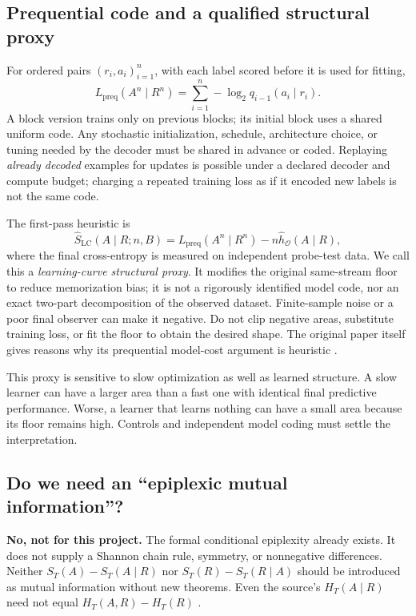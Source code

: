 \documentclass[11pt,a4paper]{article}
\newcommand{\pre}{\mathrm{preq}}
\begin{document}
\subsection{Prequential code and a qualified structural proxy}
For ordered pairs $(r_i,a_i)_{i=1}^n$, with each label scored before it is used for fitting,
\begin{equation}
L_{\pre}(A^n\mid R^n)=\sum_{i=1}^{n}-\log_2 q_{i-1}(a_i\mid r_i).
\label{eq:preq}
\end{equation}
A block version trains only on previous blocks; its initial block uses a shared uniform code. Any stochastic initialization, schedule, architecture choice, or tuning needed by the decoder must be shared in advance or coded. Replaying \emph{already decoded} examples for updates is possible under a declared decoder and compute budget; charging a repeated training loss as if it encoded new labels is not the same code.

The first-pass heuristic is
\begin{equation}
\widehat S_{\mathrm{LC}}(A\mid R;n,B)
 = L_{\pre}(A^n\mid R^n)-n\widehat h_{\mathcal O}(A\mid R),
\label{eq:proxy}
\end{equation}
where the final cross-entropy is measured on independent probe-test data. We call this a \emph{learning-curve structural proxy}. It modifies the original same-stream floor to reduce memorization bias; it is not a rigorously identified model code, nor an exact two-part decomposition of the observed dataset. Finite-sample noise or a poor final observer can make it negative. Do not clip negative areas, substitute training loss, or fit the floor to obtain the desired shape. The original paper itself gives reasons why its prequential model-cost argument is heuristic \citep[Section 4.1]{finzi2026}.

This proxy is sensitive to slow optimization as well as learned structure. A slow learner can have a larger area than a fast one with identical final predictive performance. Worse, a learner that learns nothing can have a small area because its floor remains high. Controls and independent model coding must settle the interpretation.

\subsection{Do we need an ``epiplexic mutual information''?}
\textbf{No, not for this project.} The formal conditional epiplexity already exists. It does not supply a Shannon chain rule, symmetry, or nonnegative differences. Neither $S_T(A)-S_T(A\mid R)$ nor $S_T(R)-S_T(R\mid A)$ should be introduced as mutual information without new theorems. Even the source's $H_T(A\mid R)$ need not equal $H_T(A,R)-H_T(R)$ \citep{finzi2026}.
\end{document}
